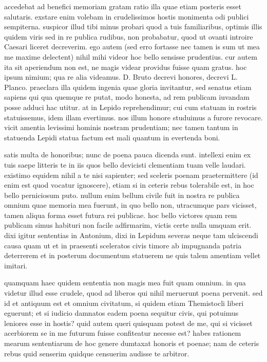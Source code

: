  accedebat ad benefici memoriam gratam ratio illa quae etiam posteris esset salutaris. exstare enim volebam in crudelissimos hostis monimenta odi publici sempiterna. suspicor illud tibi minus probari quod a tuis familiaribus, optimis illis quidem viris sed in re publica rudibus, non probabatur, quod ut ovanti introire Caesari liceret decreverim. ego autem (sed erro fortasse nec tamen is sum ut mea me maxime delectent) nihil mihi videor hoc bello sensisse prudentius. cur autem ita sit aperiendum non est, ne magis videar providus fuisse quam gratus. hoc ipsum nimium; qua re alia videamus. D. Bruto decrevi honores, decrevi L. Planco. praeclara illa quidem ingenia quae gloria invitantur, sed senatus etiam sapiens qui qua quemque re putat, modo honesta, ad rem publicam iuvandam posse adduci hac utitur. at in Lepido reprehendimur; cui cum statuam in rostris statuissemus, idem illam evertimus. nos illum honore studuimus a furore revocare. vicit amentia levissimi hominis nostram prudentiam; nec tamen tantum in statuenda Lepidi statua factum est mali quantum in evertenda boni.

 satis multa de honoribus; nunc de poena pauca dicenda sunt. intellexi enim ex tuis saepe litteris te in iis quos bello devicisti clementiam tuam velle laudari. existimo equidem nihil a te nisi sapienter; sed sceleris poenam praetermittere (id enim est quod vocatur ignoscere), etiam si in ceteris rebus tolerabile est, in hoc bello perniciosum puto. nullum enim bellum civile fuit in nostra re publica omnium quae memoria mea fuerunt, in quo bello non, utracumque pars vicisset, tamen aliqua forma esset futura rei publicae. hoc bello victores quam rem publicam simus habituri non facile adfirmarim, victis certe nulla umquam erit. dixi igitur sententias in Antonium, dixi in Lepidum severas neque tam ulciscendi causa quam ut et in praesenti sceleratos civis timore ab impugnanda patria deterrerem et in posterum documentum statuerem ne quis talem amentiam vellet imitari.

 quamquam haec quidem sententia non magis mea fuit quam omnium. in qua videtur illud esse crudele, quod ad liberos qui nihil meruerunt poena pervenit. sed id et antiquum est et omnium civitatum, si quidem etiam Themistocli liberi eguerunt; et si iudicio damnatos eadem poena sequitur civis, qui potuimus leniores esse in hostis? quid autem queri quisquam potest de me, qui si vicisset acerbiorem se in me futurum fuisse confiteatur necesse est? habes rationem mearum sententiarum de hoc genere dumtaxat honoris et poenae; nam de ceteris rebus quid senserim quidque censuerim audisse te arbitror.

